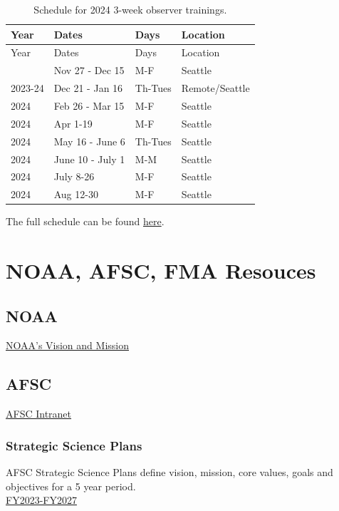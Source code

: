 \documentclass[
  letterpaper,
  DIV=11,
  numbers=noendperiod]{scrreprt}
\begin{document}
\begin{longtable}[]{@{}llll@{}}
\caption{Schedule for 2024 3-week observer trainings.}\tabularnewline
\toprule\noalign{}
Year & Dates & Days & Location \\
\midrule\noalign{}
\endfirsthead
\toprule\noalign{}
Year & Dates & Days & Location \\
\midrule\noalign{}
\endhead
\bottomrule\noalign{}
\endlastfoot
2023 & Nov 27 - Dec 15 & M-F & Seattle \\
2023-24 & Dec 21 - Jan 16 & Th-Tues & Remote/Seattle \\
2024 & Feb 26 - Mar 15 & M-F & Seattle \\
2024 & Apr 1-19 & M-F & Seattle \\
2024 & May 16 - June 6 & Th-Tues & Seattle \\
2024 & June 10 - July 1 & M-M & Seattle \\
2024 & July 8-26 & M-F & Seattle \\
2024 & Aug 12-30 & M-F & Seattle \\
\end{longtable}

The full schedule can be found
\href{https://www.fisheries.noaa.gov/alaska/fisheries-observers/north-pacific-observer-program-training-schedule}{here}.

\chapter{NOAA, AFSC, FMA Resouces}\label{sec-resources}

\section{NOAA}\label{noaa}

\href{https://www.noaa.gov/our-mission-and-vision}{NOAA's Vision and
Mission}

\section{AFSC}\label{afsc}

\href{https://sites.google.com/noaa.gov/myafsc}{AFSC Intranet}

\subsection{Strategic Science Plans}\label{strategic-science-plans}

AFSC Strategic Science Plans define vision, mission, core values, goals
and objectives for a 5 year period.\\
\href{https://drive.google.com/file/d/1m3KldIXozp1mSH-VwzSFw0F35kuVaojx/view}{FY2023-FY2027}
\end{document}

